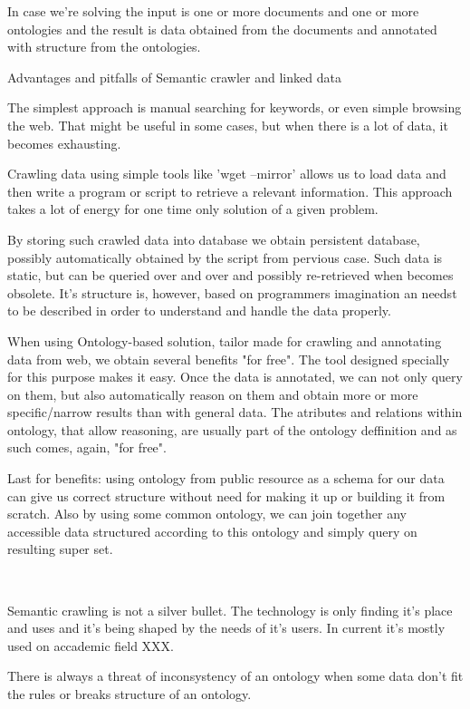 In case we're solving  the input is one or more documents and one or more
ontologies and the result is data obtained from the documents and annotated
with structure from the ontologies. 

\sec Advantages and pitfalls of Semantic crawler and linked data

The simplest approach is manual searching for keywords, or even simple browsing
the web. That might be useful in some cases, but when there is a lot of data,
it becomes exhausting. 

Crawling data using simple tools like 'wget --mirror' allows us to load data
and then write a program or script to retrieve a relevant information. This
approach takes a lot of energy for one time only solution of a given problem. 

By storing such crawled data into database we obtain persistent database,
possibly automatically obtained by the script from pervious case. Such data is
static, but can be queried over and over and possibly re-retrieved when becomes
obsolete. It's structure is, however, based on programmers imagination an
needst to be described in order to understand and handle the data properly. 

When using Ontology-based solution, tailor made for crawling and annotating
data from web, we obtain several benefits "for free". The tool designed
specially for this purpose makes it easy. Once the data is annotated, we can
not only query on them, but also automatically reason on them and obtain more
or more specific/narrow results than with general data. The atributes and
relations within ontology, that allow reasoning, are usually part of the
ontology deffinition and as such comes, again, "for free". 

Last for benefits: using ontology from public resource as a schema for our data
can give us correct structure without need for making it up or building it from
scratch. Also by using some common ontology, we can join together any
accessible data structured according to this ontology and simply query on
resulting super set. 

~

Semantic crawling is not a silver bullet. The technology is only finding it's
place and uses and it's being shaped by the needs of it's users. In current
it's mostly used on accademic field XXX. 

There is always a threat of inconsystency of an ontology when some data don't
fit the rules or breaks structure of an ontology. 

